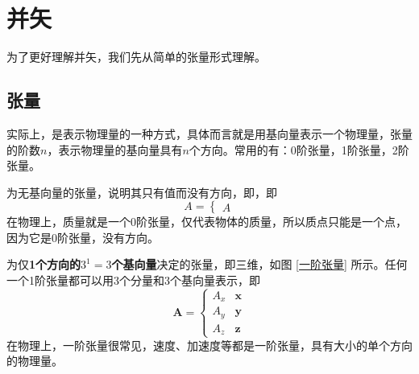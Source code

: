 



\section{并矢}
为了更好理解并矢，我们先从简单的张量形式理解。
\subsection{张量}
实际上，是表示物理量的一种方式，具体而言就是用基向量表示一个物理量，张量的阶数$n$，表示物理量的基向量具有$n$个方向。常用的有：0阶张量，1阶张量，2阶张量。
\vspace*{1em}

\sssection[0阶张量]

为无基向量的张量，说明其只有值而没有方向，即，即
\begin{equation}
    A = \begin{cases}
        A
    \end{cases}
\end{equation}
在物理上，质量就是一个0阶张量，仅代表物体的质量，所以质点只能是一个点，因为它是0阶张量，没有方向。

\vspace*{1em}

\sssection[1阶张量]

为仅\textbf{1个方向的$3^1 = 3$个基向量}决定的张量，即三维，如图 \ref{一阶张量} 所示。任何一个1阶张量都可以用3个分量和3个基向量表示，即
\begin{equation}
    \bm{A} =
    \begin{cases}
        A_x & \bm{x} \\
        A_y & \bm{y} \\
        A_z & \bm{z}
    \end{cases}
\end{equation}
在物理上，一阶张量很常见，速度、加速度等都是一阶张量，具有大小的单个方向的物理量。

